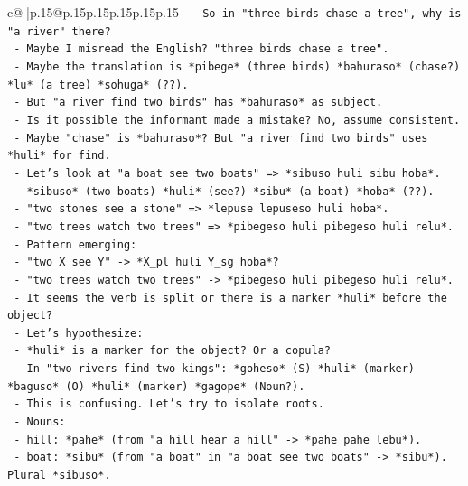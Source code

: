 \documentclass{article}
\begin{document}
{\begin{supertabular}{c@{$\;$}|p{.15\linewidth}@{}p{.15\linewidth}p{.15\linewidth}p{.15\linewidth}p{.15\linewidth}p{.15\linewidth}}
{{{\texttt{            {-} So in "three birds chase a tree", why is "a river" there?} \\
\texttt{            {-} Maybe I misread the English? "three birds chase a tree".} \\
\texttt{            {-} Maybe the translation is *pibege* (three birds) *bahuraso* (chase?) *lu* (a tree) *sohuga* (??).} \\
\texttt{            {-} But "a river find two birds" has *bahuraso* as subject.} \\
\texttt{            {-} Is it possible the informant made a mistake? No, assume consistent.} \\
\texttt{            {-} Maybe "chase" is *bahuraso*? But "a river find two birds" uses *huli* for find.} \\
\texttt{            {-} Let's look at "a boat see two boats" => *sibuso huli sibu hoba*.} \\
\texttt{              {-} *sibuso* (two boats) *huli* (see?) *sibu* (a boat) *hoba* (??).} \\
\texttt{              {-} "two stones see a stone" => *lepuse lepuseso huli hoba*.} \\
\texttt{              {-} "two trees watch two trees" => *pibegeso huli pibegeso huli relu*.} \\
\texttt{              {-} Pattern emerging:} \\
\texttt{                {-} "two X see Y" {-}> *X\_pl huli Y\_sg hoba*?} \\
\texttt{                {-} "two trees watch two trees" {-}> *pibegeso huli pibegeso huli relu*.} \\
\texttt{                {-} It seems the verb is split or there is a marker *huli* before the object?} \\
\texttt{                {-} Let's hypothesize:} \\
\texttt{                  {-} *huli* is a marker for the object? Or a copula?} \\
\texttt{                  {-} In "two rivers find two kings": *goheso* (S) *huli* (marker) *baguso* (O) *huli* (marker) *gagope* (Noun?).} \\
\texttt{                  {-} This is confusing. Let's try to isolate roots.} \\
\texttt{                  {-} Nouns:} \\
\texttt{                    {-} hill: *pahe* (from "a hill hear a hill" {-}> *pahe pahe lebu*).} \\
\texttt{                    {-} boat: *sibu* (from "a boat" in "a boat see two boats" {-}> *sibu*). Plural *sibuso*.} \\
}}}
\end{supertabular}}
\end{document}
